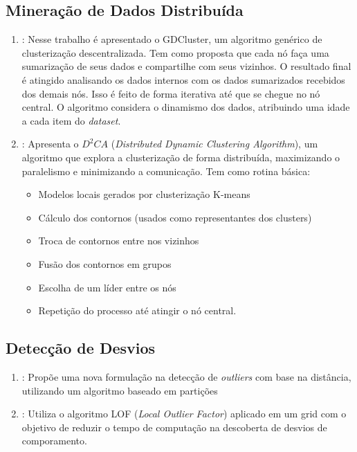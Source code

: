\subsection{Mineração de Dados Distribuída}

\begin{enumerate}

    \item \cite{001-000}: Nesse trabalho é apresentado o GDCluster, um algoritmo genérico de clusterização descentralizada. 
    Tem como proposta que cada nó faça uma sumarização de seus dados e compartilhe com seus vizinhos. O resultado final é atingido analisando os dados internos com os dados sumarizados recebidos dos demais nós. Isso é feito de forma iterativa até que se chegue no nó central.
    O algoritmo considera o dinamismo dos dados, atribuindo uma idade a cada item do \textit{dataset}.
    
    
    \item \cite{017-000}: Apresenta o $D^{2}CA$ (\textit{Distributed Dynamic Clustering Algorithm}), um algoritmo que explora a clusterização de forma distribuída, maximizando o paralelismo e minimizando a comunicação. Tem como rotina básica: \begin{itemize}
        \item Modelos locais gerados por clusterização K-means
        \item Cálculo dos contornos (usados como representantes dos clusters)
        \item Troca de contornos entre nos vizinhos
        \item Fusão dos contornos em grupos
        \item Escolha de um líder entre os nós
        \item Repetição do processo até atingir o nó central.
    \end{itemize}
    

\end{enumerate}

\subsection{Detecção de Desvios}

\begin{enumerate}
    \item \cite{022-000}: Propõe uma nova formulação na detecção de \textit{outliers} com base na distância, utilizando um algoritmo baseado em partições
    \item \cite{023-000}: Utiliza o algoritmo LOF (\textit{Local Outlier Factor}) aplicado em um grid com o objetivo de reduzir o tempo de computação na descoberta de desvios de comporamento.
\end{enumerate}

